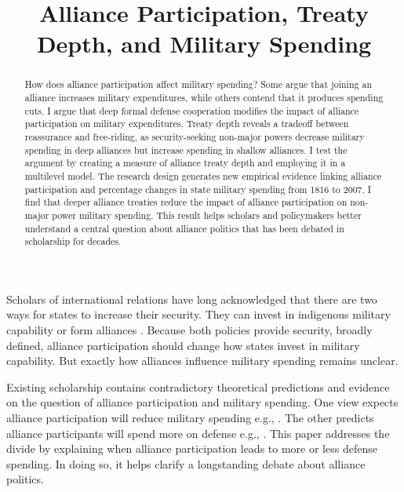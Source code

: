 \documentclass[12pt]{article}
\title{\textbf{Alliance Participation, Treaty Depth, and Military Spending}}
\date{}
\begin{document}
\maketitle 

\doublespace 

\begin{abstract}
How does alliance participation affect military spending? 
Some argue that joining an alliance increases military expenditures, while others contend that it produces spending cuts.
I argue that deep formal defense cooperation modifies the impact of alliance participation on military expenditures.  
Treaty depth reveals a tradeoff between reassurance and free-riding, as security-seeking non-major powers decrease military spending in deep alliances but increase spending in shallow alliances.   
I test the argument by creating a measure of alliance treaty depth and employing it in a multilevel model. 
The research design generates new empirical evidence linking alliance participation and percentage changes in state military spending from 1816 to 2007. 
I find that deeper alliance treaties reduce the impact of alliance participation on non-major power military spending.  
This result helps scholars and policymakers better understand a central question about alliance politics that has been debated in scholarship for decades. 
\end{abstract}


\newpage 




Scholars of international relations have long acknowledged that there are two ways for states to increase their security. 
They can invest in indigenous military capability or form alliances \citep{Morgenthau1948, Altfield1984, Morrow1993}.
Because both policies provide security, broadly defined, alliance participation should change how states invest in military capability. 
But exactly how alliances influence military spending remains unclear. 


Existing scholarship contains contradictory theoretical predictions and evidence on the question of alliance participation and military spending. 
One view expects alliance participation will reduce military spending e.g., \citep{Morrow1993, Conybeare1994}. 
The other predicts alliance participants will spend more on defense e.g., \citep{Diehl1994, MorganPalmer2006}.
This paper addresses the divide by explaining when alliance participation leads to more or less defense spending. 
In doing so, it helps clarify a longstanding debate about alliance politics.
\end{document}

